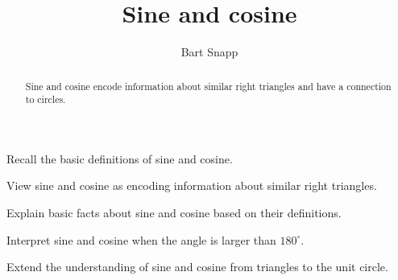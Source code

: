 \documentclass[noauthor,nooutcomes,hints,handout]{ximera}
\title{Sine and cosine}
\author{Bart Snapp}
\begin{document}
\begin{abstract}
  Sine and cosine encode information about similar right triangles and
  have a connection to circles.
\end{abstract}
\maketitle

\begin{listOutcomes}
\item Recall the basic definitions of sine and cosine.
\item View sine and cosine as encoding information about similar right
  triangles.
\item Explain basic facts about sine and cosine based on their
  definitions.
\item Interpret sine and cosine when the angle is larger than $180^\circ$.
\item Extend the understanding of sine and cosine from triangles to
  the unit circle.
\end{listOutcomes}
\mynewpage
\end{document}
